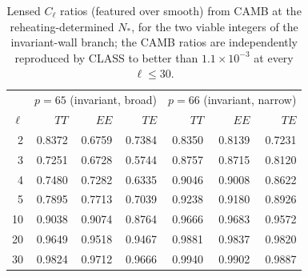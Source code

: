 \begin{table}[htbp]\centering
\begin{tabular}{r rrr rrr}
\hline
 & \multicolumn{3}{c}{$p=65$ (invariant, broad)} & \multicolumn{3}{c}{$p=66$ (invariant, narrow)} \\
$\ell$ & $TT$ & $EE$ & $TE$ & $TT$ & $EE$ & $TE$ \\
\hline
2 & 0.8372 & 0.6759 & 0.7384 & 0.8350 & 0.8139 & 0.7231 \\
3 & 0.7251 & 0.6728 & 0.5744 & 0.8757 & 0.8715 & 0.8120 \\
4 & 0.7480 & 0.7282 & 0.6335 & 0.9046 & 0.9008 & 0.8622 \\
5 & 0.7895 & 0.7713 & 0.7039 & 0.9238 & 0.9180 & 0.8926 \\
10 & 0.9038 & 0.9074 & 0.8764 & 0.9666 & 0.9683 & 0.9572 \\
20 & 0.9649 & 0.9518 & 0.9467 & 0.9881 & 0.9837 & 0.9820 \\
30 & 0.9824 & 0.9712 & 0.9666 & 0.9940 & 0.9902 & 0.9887 \\
\hline
\end{tabular}
\caption{Lensed $C_\ell$ ratios (featured over smooth) from CAMB at the reheating-determined $N_*$, for the two viable integers of the invariant-wall branch; the CAMB ratios are independently reproduced by CLASS to better than $1.1\times10^{-3}$ at every $\ell\le30$.}
\label{tab:cmbratios}
\end{table}
